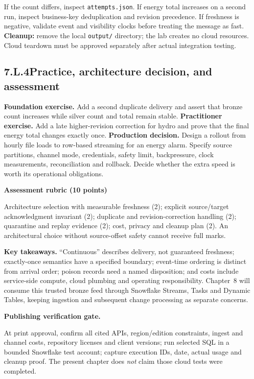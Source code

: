 \documentclass[11pt,twoside]{article}
\newcommand{\topic}[2]{\subsection*{#1\quad #2}}
\begin{document}
If the count differs, inspect \texttt{attempts.json}. If energy total increases on a second run, inspect business-key deduplication and revision precedence. If freshness is negative, validate event and visibility clocks before treating the message as fast. \textbf{Cleanup:} remove the local \texttt{output/} directory; the lab creates no cloud resources. Cloud teardown must be approved separately after actual integration testing.
\topic{7.L.4}{Practice, architecture decision, and assessment}
\textbf{Foundation exercise.} Add a second duplicate delivery and assert that bronze count increases while silver count and total remain stable. \textbf{Practitioner exercise.} Add a late higher-revision correction for hydro and prove that the final energy total changes exactly once. \textbf{Production decision.} Design a rollout from hourly file loads to row-based streaming for an energy alarm. Specify source partitions, channel mode, credentials, safety limit, backpressure, clock measurements, reconciliation and rollback. Decide whether the extra speed is worth its operational obligations.
\begin{whitebox}\textbf{Assessment rubric (10 points)}\par
Architecture selection with measurable freshness (2); explicit source/target acknowledgment invariant (2); duplicate and revision-correction handling (2); quarantine and replay evidence (2); cost, privacy and cleanup plan (2). An architectural choice without source-offset safety cannot receive full marks.\end{whitebox}
\textbf{Key takeaways.} ``Continuous'' describes delivery, not guaranteed freshness; exactly-once semantics have a specified boundary; event-time ordering is distinct from arrival order; poison records need a named disposition; and costs include service-side compute, cloud plumbing and operating responsibility. Chapter~8 will consume this trusted bronze feed through Snowflake Streams, Tasks and Dynamic Tables, keeping ingestion and subsequent change processing as separate concerns.
\begin{insight}\textbf{Publishing verification gate.}\par
At print approval, confirm all cited APIs, region/edition constraints, ingest and channel costs, repository licenses and client versions; run selected SQL in a bounded Snowflake test account; capture execution IDs, date, actual usage and cleanup proof. The present chapter does \emph{not} claim those cloud tests were completed.\end{insight}
\end{document}
